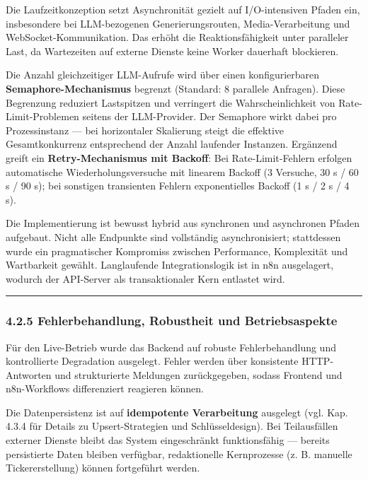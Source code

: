 Die Laufzeitkonzeption setzt Asynchronität gezielt auf I/O-intensiven
Pfaden ein, insbesondere bei LLM-bezogenen Generierungsrouten,
Media-Verarbeitung und WebSocket-Kommunikation. Das erhöht die
Reaktionsfähigkeit unter paralleler Last, da Wartezeiten auf externe
Dienste keine Worker dauerhaft blockieren.

Die Anzahl gleichzeitiger LLM-Aufrufe wird über einen konfigurierbaren
\textbf{Semaphore-Mechanismus} begrenzt (Standard: 8 parallele
Anfragen). Diese Begrenzung reduziert Lastspitzen und verringert die
Wahrscheinlichkeit von Rate-Limit-Problemen seitens der LLM-Provider.
Der Semaphore wirkt dabei pro Prozessinstanz --- bei horizontaler
Skalierung steigt die effektive Gesamtkonkurrenz entsprechend der Anzahl
laufender Instanzen. Ergänzend greift ein \textbf{Retry-Mechanismus mit
Backoff}: Bei Rate-Limit-Fehlern erfolgen automatische
Wiederholungsversuche mit linearem Backoff (3 Versuche, 30 s / 60 s / 90
s); bei sonstigen transienten Fehlern exponentielles Backoff (1 s / 2 s
/ 4 s).

Die Implementierung ist bewusst hybrid aus synchronen und asynchronen
Pfaden aufgebaut. Nicht alle Endpunkte sind vollständig asynchronisiert;
stattdessen wurde ein pragmatischer Kompromiss zwischen Performance,
Komplexität und Wartbarkeit gewählt. Langlaufende Integrationslogik ist
in n8n ausgelagert, wodurch der API-Server als transaktionaler Kern
entlastet wird.

\begin{center}\rule{0.5\linewidth}{0.5pt}\end{center}

\subsubsection{4.2.5 Fehlerbehandlung, Robustheit und
Betriebsaspekte}\label{fehlerbehandlung-robustheit-und-betriebsaspekte}

Für den Live-Betrieb wurde das Backend auf robuste Fehlerbehandlung und
kontrollierte Degradation ausgelegt. Fehler werden über konsistente
HTTP-Antworten und strukturierte Meldungen zurückgegeben, sodass
Frontend und n8n-Workflows differenziert reagieren können.

Die Datenpersistenz ist auf \textbf{idempotente Verarbeitung} ausgelegt
(vgl. Kap. 4.3.4 für Details zu Upsert-Strategien und Schlüsseldesign).
Bei Teilausfällen externer Dienste bleibt das System eingeschränkt
funktionsfähig --- bereits persistierte Daten bleiben verfügbar,
redaktionelle Kernprozesse (z. B. manuelle Tickererstellung) können
fortgeführt werden.

